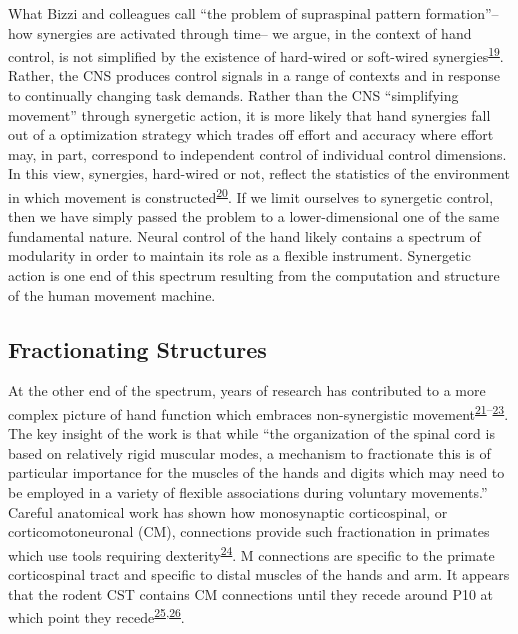 \documentclass[
  a4paper,
]{article}
\begin{document}
What Bizzi and colleagues call ``the problem of supraspinal pattern
formation''--how synergies are activated through time-- we argue, in the
context of hand control, is not simplified by the existence of
hard-wired or soft-wired
synergies\textsuperscript{\protect\hyperlink{ref-bizziMotorPlanningExecution2020}{19}}.
Rather, the CNS produces control signals in a range of contexts and in
response to continually changing task demands. Rather than the CNS
``simplifying movement'' through synergetic action, it is more likely
that hand synergies fall out of a optimization strategy which trades off
effort and accuracy where effort may, in part, correspond to independent
control of individual control dimensions. In this view, synergies,
hard-wired or not, reflect the statistics of the environment in which
movement is
constructed\textsuperscript{\protect\hyperlink{ref-brutonSynergiesCoordinationComprehensive2018}{20}}.
If we limit ourselves to synergetic control, then we have simply passed
the problem to a lower-dimensional one of the same fundamental nature.
Neural control of the hand likely contains a spectrum of modularity in
order to maintain its role as a flexible instrument. Synergetic action
is one end of this spectrum resulting from the computation and structure
of the human movement machine.

\hypertarget{fractionating-structures}{%
\subsection{Fractionating Structures}\label{fractionating-structures}}

At the other end of the spectrum, years of research has contributed to a
more complex picture of hand function which embraces non-synergistic
movement\textsuperscript{\protect\hyperlink{ref-lemon1993}{21}--\protect\hyperlink{ref-lemon2008}{23}}.
The key insight of the work is that while ``the organization of the
spinal cord is based on relatively rigid muscular modes, a mechanism to
fractionate this is of particular importance for the muscles of the
hands and digits which may need to be employed in a variety of flexible
associations during voluntary movements.'' Careful anatomical work has
shown how monosynaptic corticospinal, or corticomotoneuronal (CM),
connections provide such fractionation in primates which use tools
requiring
dexterity\textsuperscript{\protect\hyperlink{ref-lemonStartingStoppingMovement2019}{24}}.
M connections are specific to the primate corticospinal tract and
specific to distal muscles of the hands and arm. It appears that the
rodent CST contains CM connections until they recede around P10 at which
point they
recede\textsuperscript{\protect\hyperlink{ref-kawasawa2017}{25},\protect\hyperlink{ref-murabe2018}{26}}.
\end{document}
